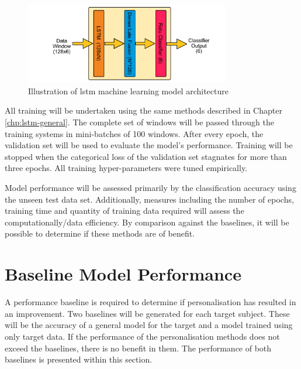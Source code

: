 \begin{figure}[htbp]
    \centering
    \includegraphics[width=0.8\textwidth]{content/5-Personalisation/ch5_lstm_architecture.pdf}
    \caption[Illustration of  machine learning model architecture]{Illustration of \acrshort{lstm} machine learning model architecture}
    \label{fig:ch5_illustration_of_base_LSTM_model}
\end{figure}

All training will be undertaken using the same methods described in Chapter \ref{chp:lstm-general}. The complete set of windows will be passed through the training systems in mini-batches of 100 windows. After every epoch, the validation set will be used to evaluate the model's performance. Training will be stopped when the categorical loss of the validation set stagnates for more than three epochs. All training hyper-parameters were tuned empirically.

Model performance will be assessed primarily by the classification accuracy using the unseen test data set. Additionally, measures including the number of epochs, training time and quantity of training data required will assess the computationally/data efficiency. By comparison against the baselines, it will be possible to determine if these methods are of benefit.

\section{Baseline Model Performance}
\label{sec:personalisation-baseline-model-results}
A performance baseline is required to determine if personalisation has resulted in an improvement. Two baselines will be generated for each target subject. These will be the accuracy of a general model for the target and a model trained using only target data. If the performance of the personalisation methods does not exceed the baselines, there is no benefit in them. The performance of both baselines is presented within this section.

